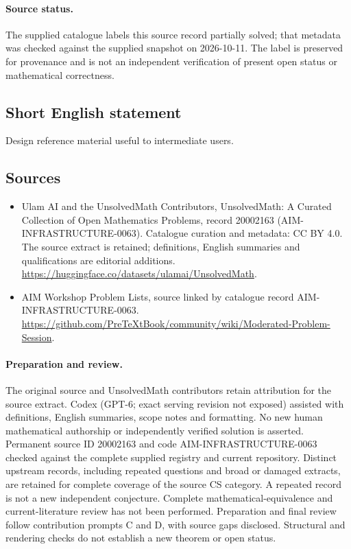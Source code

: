 \documentclass[11pt]{article}
\begin{document}
\paragraph{Source status.}
The supplied catalogue labels this source record partially solved; that metadata was checked against the supplied snapshot on 2026-10-11. The label is preserved for provenance and is not an independent verification of present open status or mathematical correctness.
\subsection{Short English statement}
Design reference material useful to intermediate users.
\subsection{Sources}
\begin{itemize}
\item[\hypertarget{source:20002163:1}{S1}] Ulam AI and the UnsolvedMath Contributors, UnsolvedMath: A Curated Collection of Open Mathematics Problems, record 20002163 (AIM-INFRASTRUCTURE-0063). Catalogue curation and metadata: CC BY 4.0. The source extract is retained; definitions, English summaries and qualifications are editorial additions.
\url{https://huggingface.co/datasets/ulamai/UnsolvedMath}.
\item[\hypertarget{source:20002163:2}{S2}] AIM Workshop Problem Lists, source linked by catalogue record AIM-INFRASTRUCTURE-0063.
\url{https://github.com/PreTeXtBook/community/wiki/Moderated-Problem-Session}.
\end{itemize}
\paragraph{Preparation and review.}
The original source and UnsolvedMath contributors retain attribution for the source extract. Codex (GPT-6; exact serving revision not exposed) assisted with definitions, English summaries, scope notes and formatting. No new human mathematical authorship or independently verified solution is asserted. Permanent source ID 20002163 and code AIM-INFRASTRUCTURE-0063 checked against the complete supplied registry and current repository. Distinct upstream records, including repeated questions and broad or damaged extracts, are retained for complete coverage of the source CS category. A repeated record is not a new independent conjecture. Complete mathematical-equivalence and current-literature review has not been performed. Preparation and final review follow contribution prompts C and D, with source gaps disclosed. Structural and rendering checks do not establish a new theorem or open status.
\label{end:20002163}
\end{document}

